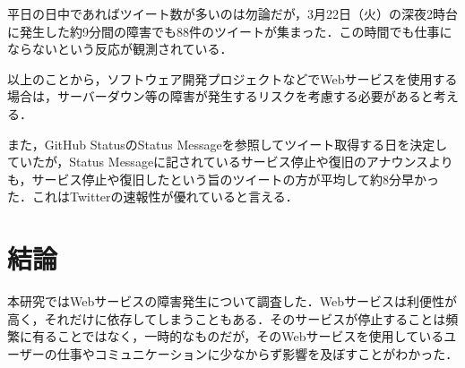 \documentclass[uplatex,twocolumn]{jsarticle}
\begin{document}
平日の日中であればツイート数が多いのは勿論だが，3月22日（火）の深夜2時台に発生した約9分間の障害でも88件のツイートが集まった．この時間でも仕事にならないという反応が観測されている．

以上のことから，ソフトウェア開発プロジェクトなどでWebサービスを使用する場合は，サーバーダウン等の障害が発生するリスクを考慮する必要があると考える．

また，GitHub StatusのStatus Messageを参照してツイート取得する日を決定していたが，Status Messageに記されているサービス停止や復旧のアナウンスよりも，サービス停止や復旧したという旨のツイートの方が平均して約8分早かった．これはTwitterの速報性が優れていると言える．

\section{結論}
本研究ではWebサービスの障害発生について調査した．Webサービスは利便性が高く，それだけに依存してしまうこともある．そのサービスが停止することは頻繁に有ることではなく，一時的なものだが，そのWebサービスを使用しているユーザーの仕事やコミュニケーションに少なからず影響を及ぼすことがわかった．


\end{document}
